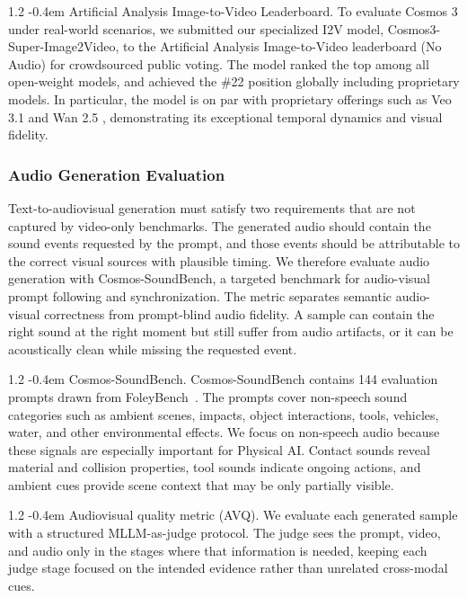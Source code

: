 \documentclass{llmxive}
\makeatletter
\providecommand{\paragraph}{  \@startsection{paragraph}{4}{\z@}    {1\baselineskip \@plus .2\baselineskip}    {-0.4em}    {\normalfont\normalsize\bfseries}}
\makeatother
\begin{document}
\paragraph{Artificial Analysis Image-to-Video Leaderboard.} To evaluate Cosmos 3 under real-world scenarios, we submitted our specialized I2V model, Cosmos3-Super-Image2Video, to the Artificial Analysis Image-to-Video leaderboard (No Audio) for crowdsourced public voting. The model ranked the top among all open-weight models, and achieved the \#22 position globally including proprietary models. In particular, the model is on par with proprietary offerings such as Veo 3.1 \citep{veo31} and Wan 2.5 \citep{wan2pt2}, demonstrating its exceptional temporal dynamics and visual fidelity.

\FloatBarrier
\subsubsection{Audio Generation Evaluation}
\label{subsec::audio_eval}
Text-to-audiovisual generation must satisfy two requirements that are not captured by video-only benchmarks. The generated audio should contain the sound events requested by the prompt, and those events should be attributable to the correct visual sources with plausible timing. We therefore evaluate audio generation with Cosmos-SoundBench, a targeted benchmark for audio-visual prompt following and synchronization. The metric separates semantic audio-visual correctness from prompt-blind audio fidelity. A sample can contain the right sound at the right moment but still suffer from audio artifacts, or it can be acoustically clean while missing the requested event.

\paragraph{Cosmos-SoundBench.}
Cosmos-SoundBench contains 144 evaluation prompts drawn from FoleyBench~\citep{foleybench}. The prompts cover non-speech sound categories such as ambient scenes, impacts, object interactions, tools, vehicles, water, and other environmental effects. We focus on non-speech audio because these signals are especially important for Physical AI. Contact sounds reveal material and collision properties, tool sounds indicate ongoing actions, and ambient cues provide scene context that may be only partially visible.

\paragraph{Audiovisual quality metric (AVQ).}
We evaluate each generated sample with a structured MLLM-as-judge protocol. The judge sees the prompt, video, and audio only in the stages where that information is needed, keeping each judge stage focused on the intended evidence rather than unrelated cross-modal cues.
\end{document}
